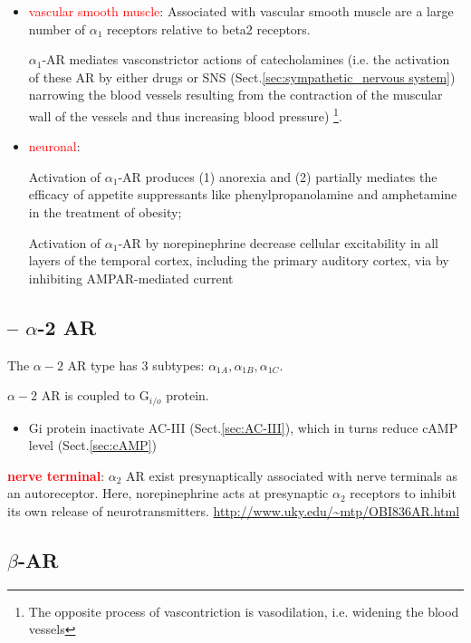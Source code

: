 \begin{itemize}
  \item \textcolor{red}{vascular smooth muscle}: Associated with vascular smooth
  muscle are a large number of $\alpha_1$ receptors relative to beta2 receptors. 

$\alpha_1$-AR mediates vasconstrictor actions of catecholamines (i.e. the
activation of these AR by either drugs or SNS (Sect.\ref{sec:sympathetic_nervous
system}) narrowing the blood vessels resulting from the contraction of the
muscular wall of the vessels and thus increasing blood pressure) \footnote{The
opposite process of vascontriction is vasodilation, i.e. widening the blood
vessels}.

  \item \textcolor{red}{neuronal}: 
  
  Activation of $\alpha_1$-AR produces (1)  anorexia and (2) partially mediates
  the efficacy of appetite suppressants like phenylpropanolamine and amphetamine in
  the treatment of obesity; 
  
  Activation of $\alpha_1$-AR by norepinephrine decrease cellular excitability in all
  layers of the temporal cortex, including the primary auditory cortex, via
  by inhibiting AMPAR-mediated current \citep{dinh2009}
  
\end{itemize}


\subsection{-- $\alpha$-2 AR}
\label{sec:alpha-2-adrenergic-receptor}

The $\alpha-2$ AR type has 3 subtypes: $\alpha_{1A}, \alpha_{1B}, \alpha_{1C}$.

$\alpha-2$ AR is coupled to G$_{i/o}$ protein.
\begin{itemize}
  \item  Gi protein inactivate AC-III (Sect.\ref{sec:AC-III}), which in turns
  reduce cAMP level (Sect.\ref{sec:cAMP})
\end{itemize}

\textcolor{red}{\bf nerve terminal}: $\alpha_2$ AR exist presynaptically
associated with nerve terminals as an autoreceptor. Here, norepinephrine acts at
presynaptic $\alpha_2$ receptors to inhibit its own release of
neurotransmitters.
\url{http://www.uky.edu/~mtp/OBI836AR.html}



\subsection{$\beta$-AR}
\label{sec:beta-adrenergic-receptor}
 \label{sec:beta-1-adrenergic-receptor}
% 
% 
 \label{sec:beta-2-adrenergic-receptor}

